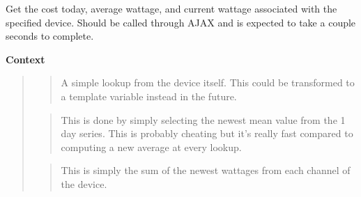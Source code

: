 \documentclass[letterpaper,10pt,english]{sphinxmanual}
\begin{document}

\begin{fulllineitems}
\label{modules/webapp:webapp.views.device_data}
Get the cost today, average wattage, and current wattage associated with the specified device.
Should be called through AJAX and is expected to take a couple seconds to complete.

\textbf{Context}
\begin{quote}

\begin{quote}

A simple lookup from the device itself. This could be transformed to a template
variable instead in the future.
\end{quote}

\begin{quote}

This is done by simply selecting the newest mean value from the 1 day series. This
is probably cheating but it's really fast compared to computing a new average
at every lookup.
\end{quote}

\begin{quote}

This is simply the sum of the newest wattages from each channel of the device.
\end{quote}
\end{quote}

\end{fulllineitems}


\begin{fulllineitems}
\label{modules/webapp:webapp.views.device_is_online}
\end{fulllineitems}


\begin{fulllineitems}
\label{modules/webapp:webapp.views.device_location}
\end{fulllineitems}
\end{document}
